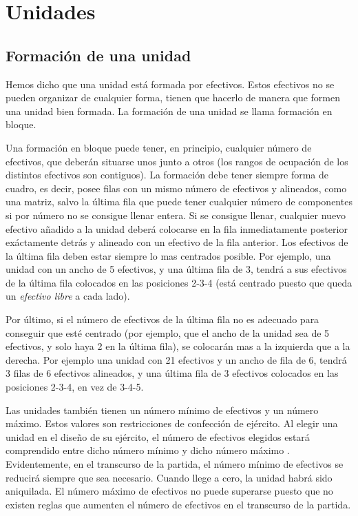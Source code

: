 \section*{Unidades}
\subsection*{Formación de una unidad}
\label{formacion}
Hemos dicho que una unidad está formada por efectivos. Estos efectivos no se pueden organizar de cualquier forma, tienen que hacerlo de manera que formen una unidad bien formada. La formación de una unidad se llama formación en bloque.

Una formación en bloque puede tener, en principio, cualquier número de
efectivos, que deberán situarse unos junto a otros (los rangos de
ocupación de los distintos efectivos son contiguos). La formación debe
tener siempre forma de cuadro, es decir, posee filas con un mismo
número de efectivos y alineados, como una matriz, salvo la última fila
que puede tener cualquier número de componentes si por número no se
consigue llenar entera. Si se consigue llenar, cualquier nuevo
efectivo añadido a la unidad deberá colocarse en la fila
inmediatamente posterior exáctamente detrás y alineado con un efectivo
de la fila anterior. Los efectivos de la última fila deben estar
siempre lo mas centrados posible. Por ejemplo, una unidad con un ancho
de 5 efectivos, y una última fila de 3, tendrá a sus efectivos de la
última fila colocados en las posiciones 2-3-4 (está centrado puesto
que queda un \textit{efectivo libre} a cada lado).

Por último, si el número de efectivos de la última fila no es adecuado
para conseguir que esté centrado (por ejemplo, que el ancho de la
unidad sea de 5 efectivos, y solo haya 2 en la última fila), se
colocarán mas a la izquierda que a la derecha.  Por ejemplo una unidad
con 21 efectivos y un ancho de fila de 6, tendrá 3 filas de 6
efectivos alineados, y una última fila de 3 efectivos colocados en las
posiciones 2-3-4, en vez de 3-4-5. 

Las unidades también tienen un número mínimo de efectivos y un número
máximo. Estos valores son restricciones de confección de
ejército. Al elegir una unidad en el diseño de su ejército, el número
de efectivos elegidos estará comprendido entre dicho número mínimo y
dicho número máximo . Evidentemente, en el
transcurso de la partida, el número
mínimo de efectivos se reducirá siempre que sea necesario. Cuando
llege a cero, la unidad habrá sido aniquilada. El número máximo de
efectivos no puede superarse puesto que no existen reglas que aumenten
el número de efectivos en el transcurso de la partida.

